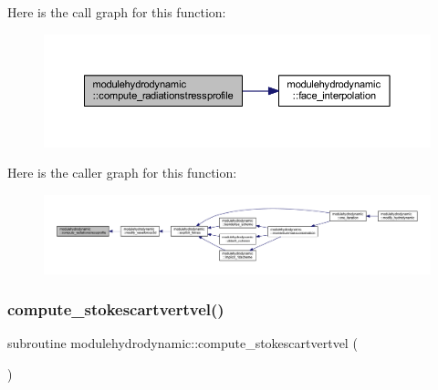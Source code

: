 Here is the call graph for this function\+:\nopagebreak
\begin{figure}[H]
\begin{center}
\leavevmode
\includegraphics[width=350pt]{namespacemodulehydrodynamic_adfd6bacb2def8a8594fec898fd389d7d_cgraph}
\end{center}
\end{figure}
Here is the caller graph for this function\+:\nopagebreak
\begin{figure}[H]
\begin{center}
\leavevmode
\includegraphics[width=350pt]{namespacemodulehydrodynamic_adfd6bacb2def8a8594fec898fd389d7d_icgraph}
\end{center}
\end{figure}
\mbox{\label{namespacemodulehydrodynamic_abb245df1c1a4f6ca752bd7181e8c61e1}} 
\subsubsection{\texorpdfstring{compute\+\_\+stokescartvertvel()}{compute\_stokescartvertvel()}}
{\footnotesize\ttfamily subroutine modulehydrodynamic\+::compute\+\_\+stokescartvertvel (\begin{DoxyParamCaption}{ }\end{DoxyParamCaption})\hspace{0.3cm}{\ttfamily [private]}}

